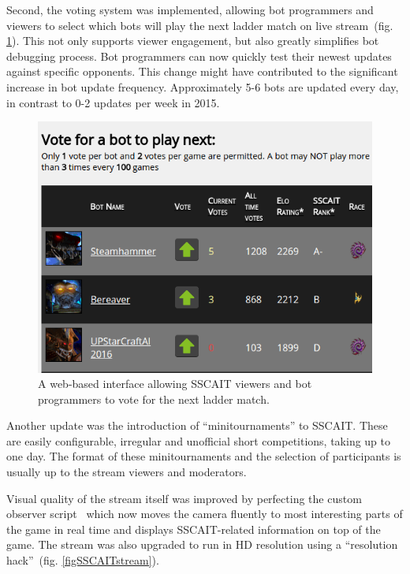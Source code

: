 Second, the voting system was implemented, allowing bot programmers and viewers to select which bots will play the next ladder match on live stream~(fig. \ref{figSSCAITvoting}). This not only supports viewer engagement, but also greatly simplifies bot debugging process. Bot programmers can now quickly test their newest updates against specific opponents. This change might have contributed to the significant increase in bot update frequency. Approximately 5-6 bots are updated every day, in contrast to 0-2 updates per week in 2015.

\begin{figure}[h]
  \centering
  \includegraphics[width=1\columnwidth]{fig/sscait-voting.png}
  \caption{A web-based interface allowing SSCAIT viewers and bot programmers to vote for the next ladder match.}
  \label{figSSCAITvoting}
\end{figure}

Another update was the introduction of ``minitournaments'' to SSCAIT. These are easily configurable, irregular and unofficial short competitions, taking up to one day. The format of these minitournaments and the selection of participants is usually up to the stream viewers and moderators. 

Visual quality of the stream itself was improved by perfecting the custom observer script~\cite{mattsson2015automatic} which now moves the camera fluently to most interesting parts of the game in real time and displays SSCAIT-related information on top of the game. The stream was also upgraded to run in HD resolution using a ``resolution hack''~(fig. \ref{figSSCAITstream}).

